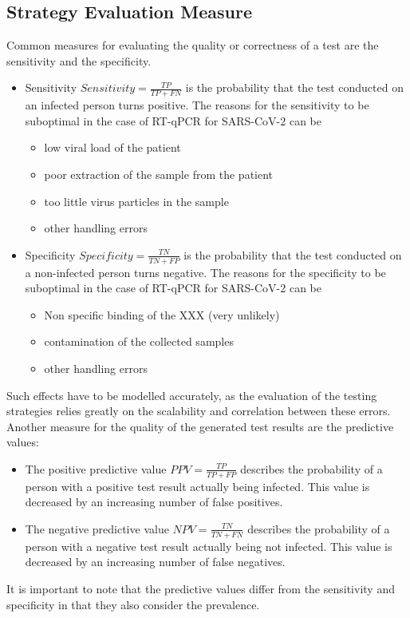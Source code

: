 \documentclass[fleqn,10pt]{wlscirep}
\begin{document}
\subsection{Strategy Evaluation Measure}
Common measures for evaluating the quality or correctness of a test are the sensitivity and the specificity.
\begin{itemize}
	\item Sensitivity $Sensitivity = \frac{TP}{TP+FN}$ is the probability that the test conducted on an infected person turns positive. The reasons for the sensitivity to be suboptimal in the case of RT-qPCR for SARS-CoV-2 can be
	\begin{itemize}
	\item{low viral load of the patient}
	\item{poor extraction of the sample from the patient}
	\item {too little virus particles in the sample}
	\item {other handling errors}
	\end{itemize}
\item Specificity $Specificity = \frac{TN}{TN+FP}$ is the probability that the test conducted on a non-infected person turns negative. The reasons for the specificity to be suboptimal in the case of RT-qPCR for SARS-CoV-2 can be
	\begin{itemize}
		\item Non specific binding of the XXX (very unlikely)
		\item contamination of the collected samples
		\item other handling errors
		
	\end{itemize}
\end{itemize}
Such effects have to be modelled accurately, as the evaluation of the testing strategies relies greatly on the scalability and correlation between these errors.\\

Another measure for the quality of the generated test results are the predictive values:
\begin{itemize}
	\item The positive predictive value  $PPV = \frac{TP}{TP+FP}$ describes the probability of a person with a positive test result actually being infected. This value is decreased by an increasing number of false positives.
	\item The negative predictive value  $NPV = \frac{TN}{TN+FN}$ describes the probability of a person with a negative test result actually being not infected. This value is decreased by an increasing number of false negatives.
\end{itemize}
It is important to note that the predictive values differ from the sensitivity and specificity in that they also consider the prevalence.\\
\end{document}

